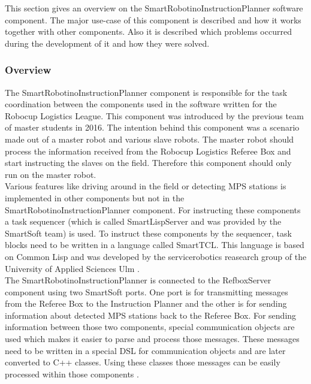 This section gives an overview on the SmartRobotinoInstructionPlanner software component. The major use-case of this component is described and how it works together with other components. Also it is described which problems occurred during the development of it and how they were solved. 


\subsubsection{Overview}
\label{sec:inst_overview}

The SmartRobotinoInstructionPlanner component is responsible for the task coordination between the components used in the software written for the 
Robocup Logistics League. This component was introduced by the previous team of master students in 2016. The intention behind this component was a scenario made out of a master robot and various slave robots. The master robot should process the information received from the Robocup Logistics Referee Box and start instructing the slaves on the field. Therefore this component should only run on the master robot. \\

Various features like driving around in the field or detecting MPS stations is implemented in other components but not in the SmartRobotinoInstructionPlanner component. For instructing these components a task sequencer (which is called SmartLispServer and was provided by the SmartSoft team) is used. To instruct these components by the sequencer, task blocks need to be written in a language called SmartTCL. This language is based on Common Lisp and was developed by the servicerobotics reasearch group of the University of Applied Sciences Ulm \cite{SS10}.  \\ 

The SmartRobotinoInstructionPlanner is connected to the RefboxServer component using two SmartSoft ports. One port is for transmitting messages from the Referee Box to the Instruction Planner and the other is for sending information about detected MPS stations back to the Referee Box. For sending information between those two components, special communication objects are used which makes it easier to parse and process those messages. These messages need to be written in a special DSL for communication objects and are later converted to C++ classes. Using these classes those messages can be easily processed within those components \cite{CO}. \\

